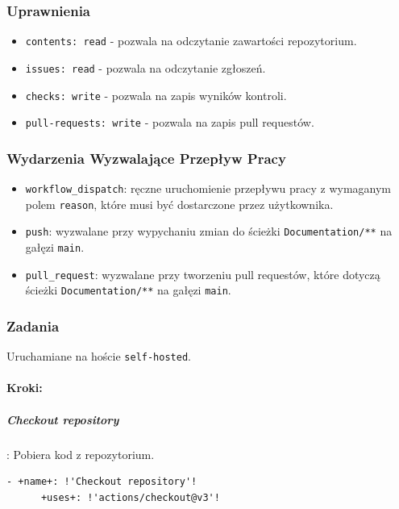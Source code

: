 \subsubsection{Uprawnienia}
\begin{itemize}
    \item \texttt{\textcolor{codeblue}{contents: read}} - pozwala na odczytanie zawartości repozytorium.
    \item \texttt{\textcolor{codeblue}{issues: read}} - pozwala na odczytanie zgłoszeń.
    \item \texttt{\textcolor{codeblue}{checks: write}} - pozwala na zapis wyników kontroli.
    \item \texttt{\textcolor{codeblue}{pull-requests: write}} - pozwala na zapis pull requestów.
\end{itemize}

\subsubsection{Wydarzenia Wyzwalające Przepływ Pracy}
\begin{itemize}
    \item \texttt{\textcolor{codeblue}{workflow\_dispatch}}: ręczne uruchomienie przepływu pracy z wymaganym polem \texttt{\textcolor{codeblue}{reason}}, które musi być dostarczone przez użytkownika.
    \item \texttt{\textcolor{codeblue}{push}}: wyzwalane przy wypychaniu zmian do ścieżki \texttt{\textcolor{codeblue}{Documentation/**}} na gałęzi \texttt{\textcolor{codeblue}{main}}.
    \item \texttt{\textcolor{codeblue}{pull\_request}}: wyzwalane przy tworzeniu pull requestów, które dotyczą ścieżki \texttt{\textcolor{codeblue}{Documentation/**}} na gałęzi \texttt{\textcolor{codeblue}{main}}.
\end{itemize}

\subsubsection{Zadania}
Uruchamiane na hoście \texttt{\textcolor{codeblue}{self-hosted}}.
\paragraph{Kroki:}
\subparagraph{Checkout repository}: Pobiera kod z repozytorium.
\begin{lstlisting}[style=yaml-colored]
    - +name+: !'Checkout repository'!
      +uses+: !'actions/checkout@v3'!
\end{lstlisting}

